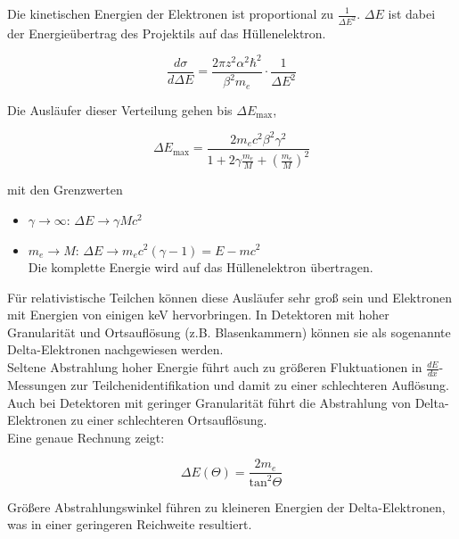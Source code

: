 Die kinetischen Energien der Elektronen ist proportional zu $\frac{1}{\Delta E^2}$. $\Delta E$ ist
dabei der Energieübertrag des Projektils auf das Hüllenelektron.

\[\frac{d\sigma}{d\Delta E} = \frac{2\pi z^2 \alpha^2 \hbar^2}{\beta^2 m_e}\cdot \frac{1}{\Delta
E^2}
\]

Die Ausläufer dieser Verteilung gehen bis $\Delta E_\text{max}$,

\[\Delta E_\text{max} = \frac{2m_e c^2 \beta^2 \gamma^2}{1+ 2\gamma
\frac{m_e}{M}+\left( \frac{m_e}{M} \right)^2}\]

mit den Grenzwerten
\begin{itemize}
  \item $\gamma\rightarrow\infty$: $\Delta E \rightarrow \gamma Mc^2$
  \item $m_e \rightarrow M$: $\Delta E \rightarrow m_e c^2 (\gamma -1) = E- m c^2$ \\
  		Die komplette Energie wird auf das Hüllenelektron übertragen.
\end{itemize}

Für relativistische Teilchen können diese Ausläufer sehr groß sein und Elektronen mit Energien von
einigen keV hervorbringen. In Detektoren mit hoher Granularität und Ortsauflösung (z.B.
Blasenkammern) können sie als sogenannte Delta-Elektronen nachgewiesen werden.
\\
Seltene Abstrahlung hoher Energie führt auch zu größeren Fluktuationen in $\frac{dE}{dx}$-Messungen
zur Teilchenidentifikation und damit zu einer schlechteren Auflösung. Auch bei Detektoren mit
geringer Granularität führt die Abstrahlung von Delta-Elektronen zu einer schlechteren
Ortsauflösung.
\\
Eine genaue Rechnung zeigt: 

\[\Delta E (\Theta) = \frac{2m_e}{\text{tan}^2\Theta} \]

Größere Abstrahlungswinkel führen zu kleineren Energien der Delta-Elektronen, was in einer
geringeren Reichweite resultiert.
